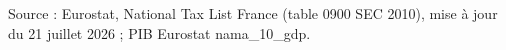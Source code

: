 Source : Eurostat, National Tax List France (table 0900 SEC 2010), mise à jour du 21 juillet 2026 ; PIB Eurostat nama\_10\_gdp.
